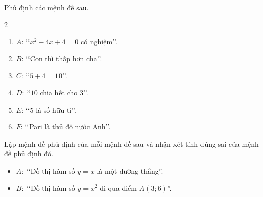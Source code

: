 \begin{bt}%
	Phủ định các mệnh đề sau.
	\begin{multicols}{2}
		\begin{enumerate}
			\item $A$: \lq\lq$x^2-4x+4=0$ có nghiệm\rq\rq.
			\item $B$: \lq\lq Con thì thấp hơn cha\rq\rq.
			\item $C$: \lq\lq$5+4=10$\rq\rq.
			\item $D$: \lq\lq$10$ chia hết cho $3$\rq\rq.
			\item $E$: \lq\lq$5$ là số hữu tỉ\rq\rq.
			\item $F$: \lq\lq Pari là thủ đô nước Anh\rq\rq.
		\end{enumerate}
	\end{multicols}
\end{bt}

\begin{bt}%
	Lập mệnh đề phủ định của mỗi mệnh đề sau và nhận xét tính đúng sai của mệnh đề phủ định đó.
	\begin{itemize}
		\item $A\colon$ ``Đồ thị hàm số $y=x$ là một đường thẳng''.
		\item $B\colon$ ``Đồ thị hàm số $y=x^2$ đi qua điểm $A(3;6)$''.	
	\end{itemize}
\end{bt}

